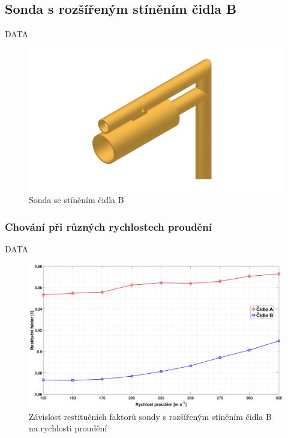     \newpage
    \subsection{Sonda s rozšířeným stíněním čidla B}
        DATA
        
        \begin{figure}[ht!]
            \centering
            \includegraphics[width=\textwidth]{400_SIMULACE_KONSTRUKCNICH_UPRAV/Vykresy_rendery/Sonda_s_rozsirenym_stinenim_B.png}
            \caption{Sonda se stíněním čidla B}
            \label{fig:sonda-s-rozsirenym-stinenim-B}
        \end{figure}
        
        \subsubsection{Chování při různých rychlostech proudění}
            DATA
            
            \begin{figure}[ht!]
                \centering
                \includegraphics*[width=\textwidth, trim={5.9cm 1.0cm 5.8cm 2.0cm}]{400_SIMULACE_KONSTRUKCNICH_UPRAV/Grafy/03_rychlosti.eps}
                \caption{Závislost restitučních faktorů sondy s rozšířeným stíněním čidla B na rychlosti proudění}
                \label{fig:sonda-s-rosirenym-stinenim-rychlosti}
            \end{figure}
